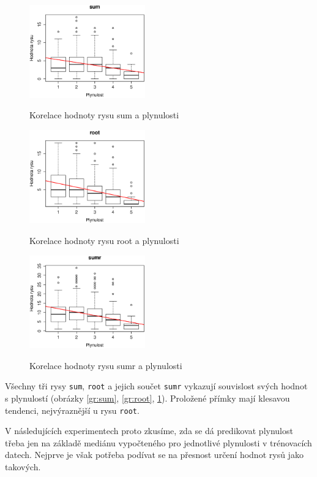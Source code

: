 \documentclass[12pt,a4paper]{report}
\begin{document}
\begin{figure}[!htb]
\begin{center}
  \centering\includegraphics[width=50mm]{./grafy/rysy/sum.eps}
  \caption{Korelace hodnoty rysu sum a plynulosti}\label{gr:sum}
\endminipage\quad
{}
  \centering\includegraphics[width=50mm]{./grafy/rysy/root.eps}
  \caption{Korelace hodnoty rysu root a plynulosti}\label{gr:root}
\endminipage\quad
{}
  \centering\includegraphics[width=50mm]{./grafy/rysy/sumr.eps}
  \caption{Korelace hodnoty rysu sumr a plynulosti}\label{gr:sumr}
\endminipage
\end{center}
\end{figure}




Všechny tři rysy \texttt{sum}, \texttt{root} a jejich součet \texttt{sumr} vykazují souvislost svých hodnot s plynulostí (obrázky \ref{gr:sum}, \ref{gr:root}, \ref{gr:sumr}). Proložené přímky mají klesavou tendenci, nejvýraznější u rysu \texttt{root}.

V následujících experimentech proto zkusíme, zda se dá predikovat plynulost třeba jen na základě mediánu vypočteného pro jednotlivé plynulosti v trénovacích datech. Nejprve je však potřeba podívat se na přesnost určení hodnot rysů jako takových.
\end{document}
